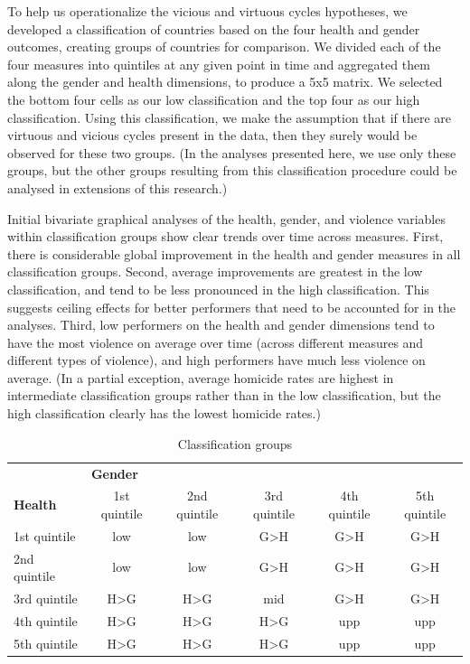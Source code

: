 \documentclass[12pt]{article}
\begin{document}
To help us operationalize the vicious and virtuous cycles hypotheses, we developed a classification of countries based on the four health and gender outcomes, creating groups of countries for comparison. We divided each of the four measures into quintiles at any given point in time and aggregated them along the gender and health dimensions, to produce a 5x5 matrix. We selected the bottom four cells as our low classification and the top four as our high classification. Using this classification, we make the assumption that if there are virtuous and vicious cycles present in the data, then they surely would be observed for these two groups. (In the analyses presented here, we use only these groups, but the other groups resulting from this classification procedure could be analysed in extensions of this research.)

Initial bivariate graphical analyses of the health, gender, and violence variables within classification groups show clear trends over time across measures. First, there is considerable global improvement in the health and gender measures in all classification groups. Second, average improvements are greatest in the low classification, and tend to be less pronounced in the high classification. This suggests ceiling effects for better performers that need to be accounted for in the analyses.
Third, low performers on the health and gender dimensions tend to have the most violence on average over time (across different measures and different types of violence), and high performers have much less violence on average. (In a partial exception, average homicide rates are highest in intermediate classification groups rather than in the low classification, but the high classification clearly has the lowest homicide rates.)

\begin{table}[!htb]
\small
\centering
\caption{Classification groups}
\label{table_class}
\begin{tabular}{lccccc}
\toprule
                & \multicolumn{5}{l}{\textbf{Gender}} \\
\textbf{Health} & 1st quintile & 2nd quintile & 3rd quintile & 4th quintile & 5th quintile \\
\midrule
1st quintile    & low & low & G>H & G>H & G>H \\
2nd quintile    & low & low & G>H & G>H & G>H \\
3rd quintile    & H>G & H>G & mid & G>H & G>H \\
4th quintile    & H>G & H>G & H>G & upp & upp \\
5th quintile    & H>G & H>G & H>G & upp & upp \\
\bottomrule
\end{tabular}
\end{table}
\end{document}
